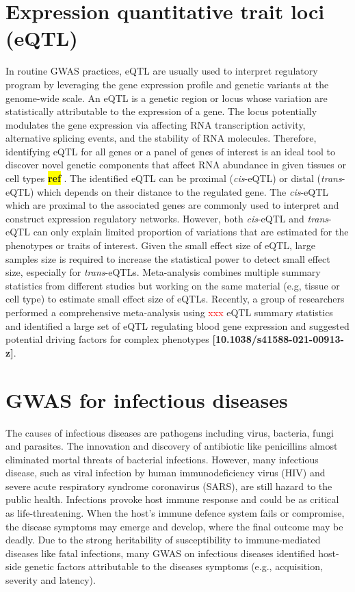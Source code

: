 \documentclass[12pt,usletter,fancy]{elegantbook}
\newcommand{\reqref}[1][ref]{
  \colorbox{yellow}{\textbf{#1}}
}
\begin{document}
\section*{Expression quantitative trait loci (eQTL)}
In routine GWAS practices, eQTL are usually used to interpret regulatory program by leveraging the gene expression profile and genetic variants at the genome-wide scale.
An eQTL is a genetic region or locus whose variation are statistically attributable to the expression of a gene.
The locus potentially modulates the gene expression via affecting RNA transcription activity, alternative splicing events, and the stability of RNA molecules.
Therefore, identifying eQTL for all genes or a panel of genes of interest is an ideal tool to discover novel genetic components that affect RNA abundance in given tissues or cell types\reqref.
The identified eQTL can be proximal (\textit{cis}-eQTL) or distal (\textit{trans}-eQTL) which depends on their distance to the regulated gene.
The \textit{cis}-eQTL which are proximal to the associated genes are commonly used to interpret and construct expression regulatory networks.
However, both \textit{cis}-eQTL and \textit{trans}-eQTL can only explain limited proportion of variations that are estimated for the phenotypes or traits of interest.
Given the small effect size of eQTL, large samples size is required to increase the statistical power to detect small effect size, especially for \textit{trans}-eQTLs.
Meta-analysis combines multiple summary statistics from different studies but working on the same material (e.g, tissue or cell type) to estimate small effect size of eQTLs.
Recently, a group of researchers performed a comprehensive meta-analysis using \textcolor{red}{xxx} eQTL summary statistics and identified a large set of eQTL regulating blood gene expression and suggested potential driving factors for complex phenotypes \textbf{[10.1038/s41588-021-00913-z]}.

\section*{GWAS for infectious diseases}
The causes of infectious diseases are pathogens including virus, bacteria, fungi and parasites.
The innovation and discovery of antibiotic like penicillins almost eliminated mortal threats of bacterial infections.
However, many infectious disease, such as viral infection by human immunodeficiency virus (HIV) and severe acute respiratory syndrome coronavirus (SARS), are still hazard to the public health.
Infections provoke host immune response and could be as critical as life-threatening.
When the host's immune defence system fails or compromise, the disease symptoms may emerge and develop, where the final outcome may be deadly.
Due to the strong heritability of susceptibility to immune-mediated diseases like fatal infections, many GWAS on infectious diseases identified host-side genetic factors attributable to the diseases symptoms (e.g., acquisition, severity and latency).
\end{document}
